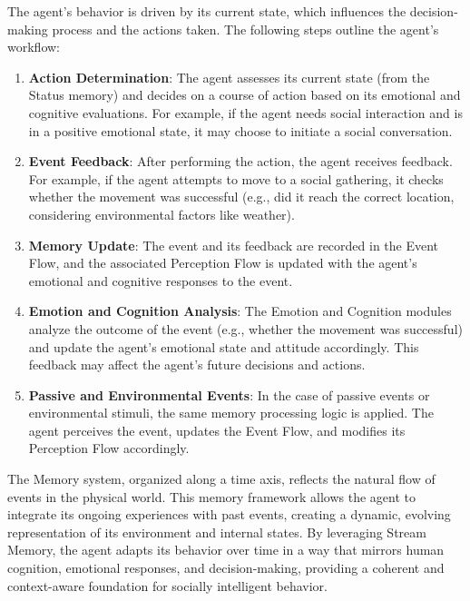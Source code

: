 The agent's behavior is driven by its current state, which influences the decision-making process and the actions taken. The following steps outline the agent's workflow:

\begin{enumerate}
    \item \textbf{Action Determination}: The agent assesses its current state (from the Status memory) and decides on a course of action based on its emotional and cognitive evaluations. For example, if the agent needs social interaction and is in a positive emotional state, it may choose to initiate a social conversation.
    \item \textbf{Event Feedback}: After performing the action, the agent receives feedback. For example, if the agent attempts to move to a social gathering, it checks whether the movement was successful (e.g., did it reach the correct location, considering environmental factors like weather).
    \item \textbf{Memory Update}: The event and its feedback are recorded in the Event Flow, and the associated Perception Flow is updated with the agent’s emotional and cognitive responses to the event.
    \item \textbf{Emotion and Cognition Analysis}: The Emotion and Cognition modules analyze the outcome of the event (e.g., whether the movement was successful) and update the agent's emotional state and attitude accordingly. This feedback may affect the agent’s future decisions and actions.
    \item \textbf{Passive and Environmental Events}: In the case of passive events or environmental stimuli, the same memory processing logic is applied. The agent perceives the event, updates the Event Flow, and modifies its Perception Flow accordingly.
\end{enumerate}

The Memory system, organized along a time axis, reflects the natural flow of events in the physical world. This memory framework allows the agent to integrate its ongoing experiences with past events, creating a dynamic, evolving representation of its environment and internal states. By leveraging Stream Memory, the agent adapts its behavior over time in a way that mirrors human cognition, emotional responses, and decision-making, providing a coherent and context-aware foundation for socially intelligent behavior.





